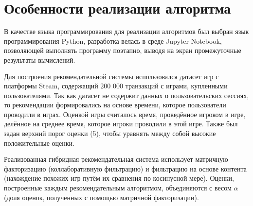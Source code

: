 \chapter{Особенности реализации алгоритма}

В качестве языка программирования для реализации алгоритмов был выбран язык программирования Python, разработка велась в среде Jupyter Notebook, позволяющей выполнять программу поэтапно, выводя на экран промежуточные результаты вычислений.

Для построения рекомендательной системы использовался датасет игр с платформы Steam, содержащий 200 000 транзакций с играми, купленными пользователями. Так как датасет не содержит данных о пользовательских сессиях, то рекомендации формировались на основе времени, которое пользователи проводили в играх. Оценкой игры считалось время, проведённое игроком в игре, делённое на среднее время, которое игроки проводили в этой игре. Также был задан верхний порог оценки (5), чтобы уравнять между собой высокие положительные оценки.

Реализованная гибридная рекомендательная система использует матричную факторизацию (коллаборативную фильтрацию) и фильтрацию на основе контента (нахождение похожих игр путём их сравнения по косинусной мере). Оценки, построенные каждым рекомендательным алгоритмом, объединяются с весом $\alpha$ (доля оценок, полученных с помощью матричной факторизации).

\clearpage

